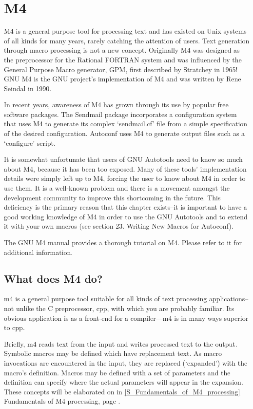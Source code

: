 \chapter{M4}\label{C_M4}
M4 is a general purpose tool for processing text and has existed on Unix 
systems of all kinds for many years, rarely catching the attention of users.
Text generation through macro processing is not a new concept. Originally M4 
was designed as the preprocessor for the Rational FORTRAN system and was 
influenced by the General Purpose Macro generator, GPM, first described by 
Stratchey in 1965! GNU M4 is the GNU project's implementation of M4 and was 
written by Rene Seindal in 1990.\par
In recent years, awareness of M4 has grown through its use by popular free software packages. The Sendmail package incorporates a configuration system that uses M4 to generate its complex `sendmail.cf' file from a simple specification of the desired configuration. Autoconf uses M4 to generate output files such as a `configure' script.\par
It is somewhat unfortunate that users of GNU Autotools need to know so much about M4, because it has been too exposed. Many of these tools' implementation details were simply left up to M4, forcing the user to know about M4 in order to use them. It is a well-known problem and there is a movement amongst the development community to improve this shortcoming in the future. This deficiency is the primary reason that this chapter exists--it is important to have a good working knowledge of M4 in order to use the GNU Autotools and to extend it with your own macros (see section 23. Writing New Macros for Autoconf).\par
The GNU M4 manual provides a thorough tutorial on M4. Please refer to it for additional information. 


\section{What does M4 do?}

m4 is a general purpose tool suitable for all kinds of text processing applications--not unlike the C preprocessor, cpp, with which you are probably familiar. Its obvious application is as a front-end for a compiler---m4 is in many ways superior to cpp.

Briefly, m4 reads text from the input and writes processed text to the output. Symbolic macros may be defined which have replacement text. As macro invocations are encountered in the input, they are replaced (`expanded') with the macro's definition. Macros may be defined with a set of parameters and the definition can specify where the actual parameters will appear in the expansion. These concepts will be elaborated on in \ref{S_Fundamentals_of_M4_processing}
Fundamentals of M4 processing, page \pageref{S_Fundamentals_of_M4_processing}.

